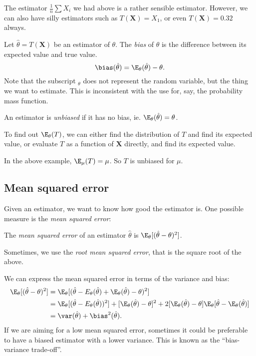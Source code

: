 \documentclass[a4paper]{article}
\begin{document}
The estimator $\frac{1}{n}\sum X_i$ we had above is a rather sensible estimator. However, we can also have silly estimators such as $T(\mathbf{X}) = X_1$, or even $T(\mathbf{X}) = 0.32$ always.

\begin{defi}[Bias]
  Let $\hat{\theta} = T(\mathbf{X})$ be an estimator of $\theta$. The \emph{bias} of $\hat{\theta}$ is the difference between its expected value and true value.
  \[
    \bias(\hat{\theta}) = \E_\theta(\hat{\theta}) - \theta.
  \]
  Note that the subscript $_\theta$ does not represent the random variable, but the thing we want to estimate. This is inconsistent with the use for, say, the probability mass function.

  An estimator is \emph{unbiased} if it has no bias, ie. $\E_\theta(\hat{\theta}) = \theta$.
\end{defi}
To find out $\E_\theta (T)$, we can either find the distribution of $T$ and find its expected value, or evaluate $T$ as a function of $\mathbf{X}$ directly, and find its expected value.

\begin{eg}
  In the above example, $\E_\mu(T) =\mu$. So $T$ is unbiased for $\mu$.
\end{eg}
\subsection{Mean squared error}
Given an estimator, we want to know how good the estimator is. One possible measure is the \emph{mean squared error}:

\begin{defi}
  The \emph{mean squared error} of an estimator $\hat{\theta}$ is $\E_\theta[(\hat{\theta} - \theta)^2]$.

  Sometimes, we use the \emph{root mean squared error}, that is the square root of the above.
\end{defi}
We can express the mean squared error in terms of the variance and bias:
\begin{align*}
  \E_\theta[(\hat{\theta} - \theta)^2] &= \E_\theta[(\hat{\theta} - E_\theta(\hat{\theta}) + \E_\theta(\hat{\theta}) - \theta)^2]\\
  &= \E_\theta[(\hat{\theta} - E_\theta(\hat{\theta}))^2] + [\E_\theta(\hat{\theta}) - \theta]^2 + 2[\E_\theta(\hat{\theta}) - \theta]\E_\theta[\hat{\theta} - \E_\theta(\hat{\theta})]\\
  &= \var(\hat{\theta}) + \bias^2(\hat{\theta}).
\end{align*}
If we are aiming for a low mean squared error, sometimes it could be preferable to have a biased estimator with a lower variance. This is known as the ``bias-variance trade-off''.
\end{document}
